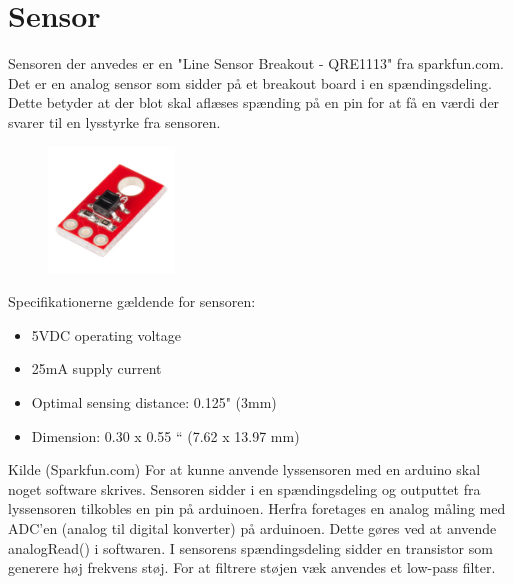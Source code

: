 \section{Sensor}
Sensoren der anvedes er en "Line Sensor Breakout - QRE1113" fra sparkfun.com. Det er en analog sensor som sidder på et breakout board i en spændingsdeling. Dette betyder at der blot skal aflæses spænding på en pin for at få en værdi der svarer til en lysstyrke fra sensoren.

\begin{figure}[h!]
  \centering
  \includegraphics[width=0.3\textwidth]{figures/lyssensor.png}
\end{figure}

Specifikationerne gældende for sensoren: 
\begin{itemize}  
\item 5VDC operating voltage 
\item 25mA supply current
\item Optimal sensing distance: 0.125" (3mm) 
\item Dimension: 0.30 x 0.55 “ (7.62 x 13.97 mm)
\end{itemize}

Kilde (Sparkfun.com)
\newline
For at kunne anvende lyssensoren med en arduino skal noget software skrives. Sensoren sidder i en spændingsdeling og outputtet fra lyssensoren tilkobles en pin på arduinoen.
Herfra foretages en analog måling med ADC'en (analog til digital konverter) på arduinoen. Dette gøres ved at anvende analogRead() i softwaren.
\newline
I sensorens spændingsdeling sidder en transistor som generere høj frekvens støj. For at filtrere støjen væk anvendes et low-pass filter.
\newline
